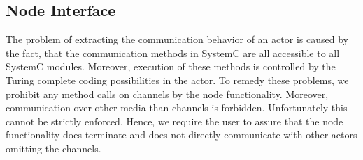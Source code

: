%  

%  

\subsection{Node Interface}
The problem of extracting the communication behavior of an actor is caused
by the fact, that the communication methods in SystemC are all accessible
to all SystemC modules. Moreover, execution of these methods is controlled
by the Turing complete coding possibilities in the actor. To remedy these
problems, we prohibit any method calls on \SysteMoC{} channels
by the node functionality. Moreover,
communication over other media than \SysteMoC{} channels is forbidden.
Unfortunately this cannot be strictly enforced. Hence, we require the \SysteMoC{} user
to assure that the node functionality does terminate and does not
directly communicate with other actors omitting the \SysteMoC{} channels.

